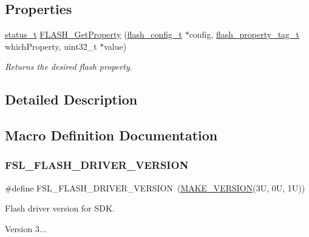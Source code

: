 \subsection*{Properties}
\begin{DoxyCompactItemize}
\item 
\mbox{\hyperlink{group__ksdk__common_gaaabdaf7ee58ca7269bd4bf24efcde092}{status\+\_\+t}} \mbox{\hyperlink{group__ftfx__flash__driver_gafd0d83bc8fec50fe9a9121d2ec906697}{F\+L\+A\+S\+H\+\_\+\+Get\+Property}} (\mbox{\hyperlink{group__ftfx__flash__driver_ga0dfc969e6f9e17c17e60d823565141a5}{flash\+\_\+config\+\_\+t}} $\ast$config, \mbox{\hyperlink{group__ftfx__flash__driver_gaded074dd3bc89c29d97e51089902698a}{flash\+\_\+property\+\_\+tag\+\_\+t}} which\+Property, uint32\+\_\+t $\ast$value)
\begin{DoxyCompactList}\small\item\em Returns the desired flash property. \end{DoxyCompactList}\end{DoxyCompactItemize}


\subsection{Detailed Description}


\subsection{Macro Definition Documentation}
\mbox{\label{group__ftfx__flash__driver_gae110eddb64c67bfc620e80afd94dd281}} 
\subsubsection{\texorpdfstring{FSL\_FLASH\_DRIVER\_VERSION}{FSL\_FLASH\_DRIVER\_VERSION}}
{\footnotesize\ttfamily \#define F\+S\+L\+\_\+\+F\+L\+A\+S\+H\+\_\+\+D\+R\+I\+V\+E\+R\+\_\+\+V\+E\+R\+S\+I\+ON~(\mbox{\hyperlink{group__ftfx__utilities_ga812138aa3315b0c6953c1a26130bcc37}{M\+A\+K\+E\+\_\+\+V\+E\+R\+S\+I\+ON}}(3\+U, 0\+U, 1\+U))}



Flash driver version for S\+DK. 

Version 3... \mbox{\label{group__ftfx__flash__driver_gaa7876ee38a9d9186aa38de406c55bef3}} 
